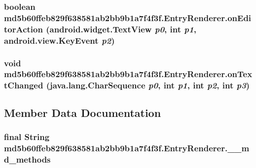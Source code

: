 \hypertarget{classmd5b60ffeb829f638581ab2bb9b1a7f4f3f_1_1_entry_renderer_099a976db3b379379d84776f7b194fed}{
\subsubsection[{onEditorAction}]{\setlength{\rightskip}{0pt plus 5cm}boolean md5b60ffeb829f638581ab2bb9b1a7f4f3f.EntryRenderer.onEditorAction (android.widget.TextView {\em p0}, \/  int {\em p1}, \/  android.view.KeyEvent {\em p2})}}
\label{classmd5b60ffeb829f638581ab2bb9b1a7f4f3f_1_1_entry_renderer_099a976db3b379379d84776f7b194fed}


\hypertarget{classmd5b60ffeb829f638581ab2bb9b1a7f4f3f_1_1_entry_renderer_8f550bc686abb5ee849838c8139aa969}{
\subsubsection[{onTextChanged}]{\setlength{\rightskip}{0pt plus 5cm}void md5b60ffeb829f638581ab2bb9b1a7f4f3f.EntryRenderer.onTextChanged (java.lang.CharSequence {\em p0}, \/  int {\em p1}, \/  int {\em p2}, \/  int {\em p3})}}
\label{classmd5b60ffeb829f638581ab2bb9b1a7f4f3f_1_1_entry_renderer_8f550bc686abb5ee849838c8139aa969}




\subsection{Member Data Documentation}
\hypertarget{classmd5b60ffeb829f638581ab2bb9b1a7f4f3f_1_1_entry_renderer_d2206e7a8e60b685459381a385bdf9f1}{
\subsubsection[{\_\-\_\-md\_\-methods}]{\setlength{\rightskip}{0pt plus 5cm}final String {\bf md5b60ffeb829f638581ab2bb9b1a7f4f3f.EntryRenderer.\_\-\_\-md\_\-methods}}}
\label{classmd5b60ffeb829f638581ab2bb9b1a7f4f3f_1_1_entry_renderer_d2206e7a8e60b685459381a385bdf9f1}




